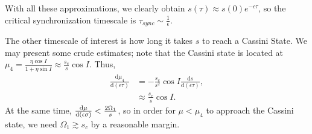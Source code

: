 \documentclass[11pt,
        usenames, %
        dvipsnames %
    ]{article}
\newcommand*{\rd}[2]{\frac{\mathrm{d}#1}{\mathrm{d}#2}}
\DeclarePairedDelimiter\p{\lparen}{\rparen}
\begin{document}
With all these approximations, we clearly obtain $s(\tau) \approx
s(0)e^{-\epsilon \tau}$, so the critical synchronization
timescale is $\tau_{sync} \sim \frac{1}{\epsilon}$.

The other timescale of interest is how long it takes $\hat{s}$ to reach a
Cassini State. We may present some crude estimates; note that the Cassini state
is located at $\mu_4 = \frac{\eta \cos I}{1 + \eta \sin I} \approx
\frac{s_c}{s}\cos I$. Thus,
\begin{align*}
    \rd{\mu_4}{(\epsilon \tau)} &= -\frac{s_c}{s^2}\cos I
            \rd{s}{(\epsilon\tau)},\\
        &\approx \frac{s_c}{s}\cos I.
\end{align*}
At the same time, $\rd{\mu}{\p*{\epsilon\sigma}} < \frac{2\Omega_1}{s}$, so in
order for $\mu < \mu_4$ to approach the Cassini state, we need $\Omega_1 \gtrsim
s_c$ by a reasonable margin.
\end{document}
